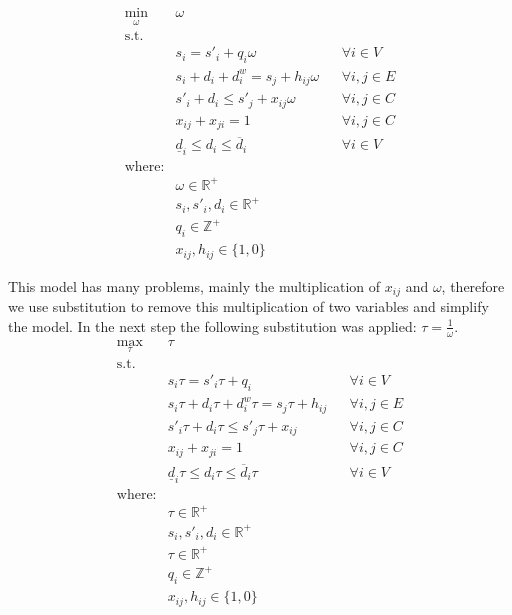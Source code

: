 \begin{align}
    \min_\omega\text{ } & \omega  \\
    \text{s.t. } \\
        & s_i  =  s'_i + q_i \omega & & \forall i \in V     \label{eq:milp_vertices}\\
        & s_i + d_i + d^w_i =  s_j + h_{ij} \omega & & \forall i, j \in E \label{eq:milp_edges}\\
        & s'_i + d_i  \leq  s'_j + x_{ij} \omega & & \forall i, j \in C \label{eq:milp_collisions}\\
        & x_{ij} + x_{ji}  =  1 & & \forall i, j \in C \\
        & \underline{d}_i \leq  d_i \leq \overline{d}_i & & \forall i \in V \\
    \text{where:} \\
        & \omega \in \mathbb{R}^+\\
        & s_i, s'_i, d_i \in \mathbb{R}^+\\
        & q_i \in \mathbb{Z}^+\\
        & x_{ij}, h_{ij} \in \{1, 0\} 
\end{align}

This model has many problems, mainly the multiplication of $x_{ij}$ and  $\omega$, therefore we use substitution to remove this multiplication of two variables and simplify the model. In the next step the following substitution was applied: $\tau = \frac{1}{\omega}$. \\

\begin{align}
\max_\tau\text{ } & \tau  \\
    \text{s.t. } \\
        & s_i \tau = s'_i \tau + q_i & & \forall i \in V \\
        & s_i \tau + d_i \tau + d^w_i \tau = s_j \tau + h_{ij} & & \forall i, j \in E \\
        & s'_i \tau + d_i \tau \leq s'_j \tau + x_{ij} & & \forall i, j \in C \\
        & x_{ij} + x_{ji} = 1 & & \forall i, j \in C \\
        & \underline{d}_i \tau \leq  d_i \tau \leq \overline{d}_i \tau & & \forall i \in V \\
    \text{where:} \\
        & \tau \in \mathbb{R}^+\\
        & s_i, s'_i, d_i \in \mathbb{R}^+\\
        & \tau \in \mathbb{R}^+ \\
        & q_i \in \mathbb{Z}^+\\
        & x_{ij}, h_{ij} \in \{1, 0\} 
\end{align}


